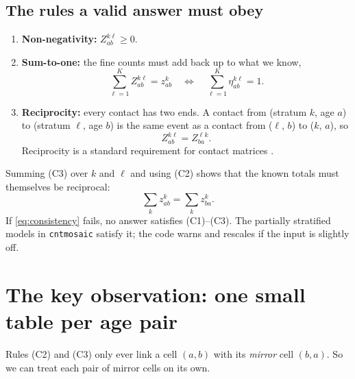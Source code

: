 \documentclass[11pt,a4paper]{article}
\theoremstyle{definition}
\theoremstyle{remark}
\begin{document}
\subsection{The rules a valid answer must obey}

\begin{enumerate}
  \item[(C1)] \textbf{Non-negativity:} $Z^{k\ell}_{ab} \ge 0$.
  \item[(C2)] \textbf{Sum-to-one:} the fine counts must add back up to what we
        know,
        \begin{equation}
          \sum_{\ell=1}^{K} Z^{k\ell}_{ab} = z^{k}_{ab}
          \quad\Longleftrightarrow\quad
          \sum_{\ell=1}^{K} \eta^{k\ell}_{ab} = 1 .
        \end{equation}
  \item[(C3)] \textbf{Reciprocity:} every contact has two ends. A contact
        from (stratum $k$, age $a$) to (stratum $\ell$, age $b$) is the same
        event as a contact from ($\ell$, $b$) to ($k$, $a$), so
        \begin{equation}
          Z^{k\ell}_{ab} = Z^{\ell k}_{ba}.
        \end{equation}
        Reciprocity is a standard requirement for contact matrices
        \citep{wallinga2006using,arregui2018projecting}.
\end{enumerate}

Summing (C3) over $k$ and $\ell$ and using (C2) shows that the known totals
must themselves be reciprocal:
\begin{equation}
  \label{eq:consistency}
  \sum_{k} z^{k}_{ab} = \sum_{k} z^{k}_{ba}.
\end{equation}
If \eqref{eq:consistency} fails, no answer satisfies (C1)--(C3). The
partially stratified models in \texttt{cntmosaic} satisfy it; the code warns
and rescales if the input is slightly off.

\section{The key observation: one small table per age pair}
\label{sec:tables}

Rules (C2) and (C3) only ever link a cell $(a,b)$ with its \emph{mirror}
cell $(b,a)$. So we can treat each pair of mirror cells on its own.
\end{document}
